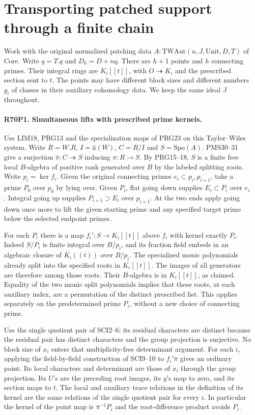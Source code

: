 \section{Transporting patched support through a finite chain}

Work with the original normalized patching data
$A:\mathrm{TWAut}(u,J,\mathrm{Unit},D,T)$ of $\mathrm{Core}$.
Write $q=T.q$ and $D_0=D+nq$. There are $h+1$ points and
$h$ connecting primes. Their integral rings are $K_i[[t]]$,
with $O\twoheadrightarrow K_i$ and the prescribed section
sent to $t$. The points may have different block sizes and different
numbers $g_i$ of classes in their auxiliary cohomology data.
We keep the same ideal $J$ throughout.

\paragraph{R70P1. Simultaneous lifts with prescribed prime kernels.}
Use LIM18, PRG13 and the specialization maps of PRG23 on this
Taylor--Wiles system. Write $R=W.R$, $I=\mathrm{ii}(W)$,
$C=R/I$ and $S=\mathrm{Spo}(A)$. PMS30--31 give a surjection
$\bar\pi:C\twoheadrightarrow S$ inducing $\pi:R\to S$.
By PRG15--18, $S$ is a finite free local $B$-algebra of positive
rank generated over $B$ by the labeled splitting roots.
Write $p_i=\ker f_i$. Given the original connecting primes
$e_i\subset p_i,p_{i+1}$, take a prime $P_0$ over $p_0$ by
lying over. Given $P_i$, flat going down supplies $E_i\subset P_i$
over $e_i$. Integral going up supplies $P_{i+1}\supset E_i$ over
$p_{i+1}$. At the two ends apply going down once more to lift
the given starting prime and any specified target prime below the
selected endpoint primes.

For each $P_i$ there is a map $f_i':S\to K_i[[t]]$ above $f_i$
with kernel exactly $P_i$. Indeed $S/P_i$ is finite integral over
$B/p_i$, and its fraction field embeds in an algebraic closure
of $K_i((t))$ over $B/p_i$. The specialized monic polynomials
already split into the specified roots in $K_i[[t]]$. The images
of all generators are therefore among those roots. Their $B$-algebra
is in $K_i[[t]]$, as claimed. Equality of the two monic split
polynomials implies that these roots, at each auxiliary index,
are a permutation of the distinct prescribed list. This applies
separately on the predetermined prime $P_i$, without a new
choice of connecting prime.

Use the single quotient pair of SCI2--6: its residual characters
are distinct because the residual pair has distinct characters and
the group projection is surjective. No block size of $x_i$ enters
that multiplicity-free determinant argument. For each $i$, applying
the field-by-field construction of SCI9--10 to $f_i'\bar\pi$
gives an ordinary point. Its local characters and determinant
are those of $x_i$ through the group projection. Its $U$'s are
the preceding root images, its $y$'s map to zero, and its section
maps to $t$. The local and auxiliary trace relations in the
definition of its kernel are the same relations of the single
quotient pair for every $i$. In particular the kernel of the
point map is $\bar\pi^{-1}P_i$ and the root-difference product
avoids $P_i$.

